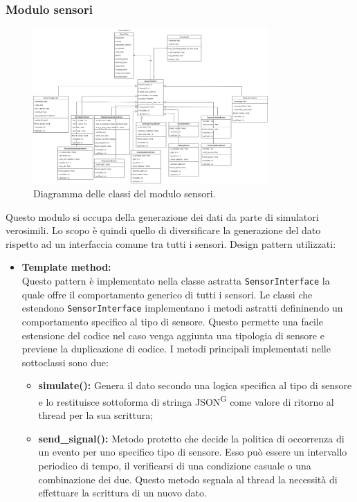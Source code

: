 \documentclass[8pt]{article}
\newcommand{\glossterm}[1]{#1\textsuperscript{G}} %
\begin{document}
\subsubsection{Modulo sensori}
\begin{figure}[h!]
    \centering
    \includegraphics[width=0.8\textwidth]{images_st/sensors.png}
    \caption{Diagramma delle classi del modulo sensori.}
    \label{fig:Diagramma delle classi del modulo sensori}
\end{figure}
Questo modulo si occupa della generazione dei dati da parte di simulatori verosimili. Lo scopo è quindi quello di diversificare la generazione del dato rispetto ad un interfaccia comune tra tutti i sensori.
Design pattern utilizzati: 
\begin{itemize}
	\setlength\itemsep{0em}
    \item \textbf{Template method:} 
    \\Questo pattern è implementato nella classe astratta \verb|SensorInterface| la quale offre il comportamento generico di tutti i sensori. Le classi che estendono \verb|SensorInterface| implementano i metodi astratti defininendo un comportamento specifico al tipo di sensore.
    Questo permette una facile estensione del codice nel caso venga aggiunta una tipologia di sensore e previene la duplicazione di codice. I metodi principali implementati nelle sottoclassi sono due:
    \begin{itemize}
	\setlength\itemsep{0em}
        \item \textbf{simulate():} Genera il dato secondo una logica specifica al tipo di sensore e lo restituisce sottoforma di stringa \glossterm{JSON} come valore di ritorno al thread per la sua scrittura;
        \item \textbf{send\_signal():} Metodo protetto che decide la politica di occorrenza di un evento per uno specifico tipo di sensore. Esso può essere un intervallo periodico di tempo, il verificarsi di una condizione casuale o una combinazione dei due. Questo metodo segnala al thread la necessità di effettuare la scrittura di un nuovo dato. 
    \end{itemize}
\end{itemize}
\end{document}
